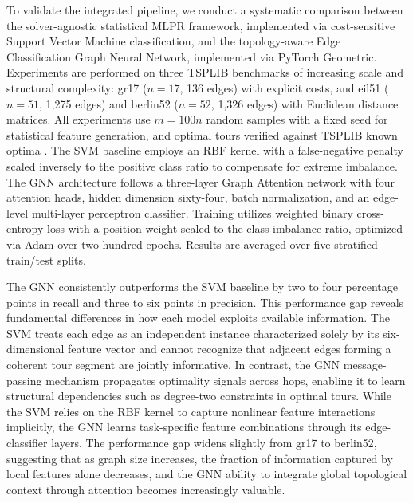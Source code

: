 \documentclass[10pt,twoside]{article}
\numberwithin{equation}{section}
\begin{document}
	To validate the integrated pipeline, we conduct a systematic comparison between the solver-agnostic statistical MLPR framework, implemented via cost-sensitive Support Vector Machine classification, and the topology-aware Edge Classification Graph Neural Network, implemented via PyTorch Geometric. Experiments are performed on three TSPLIB benchmarks of increasing scale and structural complexity: gr17 ($n=17$, 136 edges) with explicit costs, and eil51 ($n=51$, 1,275 edges) and berlin52 ($n=52$, 1,326 edges) with Euclidean distance matrices. All experiments use $m=100n$ random samples with a fixed seed for statistical feature generation, and optimal tours verified against TSPLIB known optima \cite{reinelt1991tsplib}. The SVM baseline employs an RBF kernel with a false-negative penalty scaled inversely to the positive class ratio to compensate for extreme imbalance. The GNN architecture follows a three-layer Graph Attention network with four attention heads, hidden dimension sixty-four, batch normalization, and an edge-level multi-layer perceptron classifier. Training utilizes weighted binary cross-entropy loss with a position weight scaled to the class imbalance ratio, optimized via Adam over two hundred epochs. Results are averaged over five stratified train/test splits.


	


	 The GNN consistently outperforms the SVM baseline by two to four percentage points in recall and three to six points in precision. This performance gap reveals fundamental differences in how each model exploits available information. The SVM treats each edge as an independent instance characterized solely by its six-dimensional feature vector and cannot recognize that adjacent edges forming a coherent tour segment are jointly informative. In contrast, the GNN message-passing mechanism propagates optimality signals across hops, enabling it to learn structural dependencies such as degree-two constraints in optimal tours. While the SVM relies on the RBF kernel to capture nonlinear feature interactions implicitly, the GNN learns task-specific feature combinations through its edge-classifier layers. The performance gap widens slightly from gr17 to berlin52, suggesting that as graph size increases, the fraction of information captured by local features alone decreases, and the GNN ability to integrate global topological context through attention becomes increasingly valuable.	


	
\end{document}
